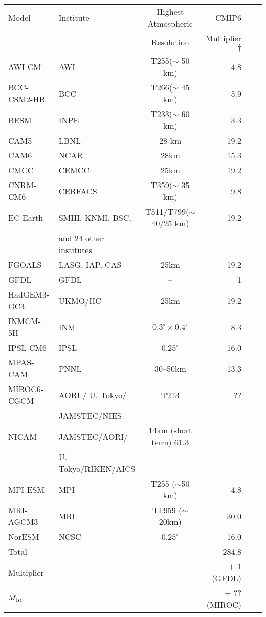 \documentclass[11pt]{article}
\begin{document}
\begin{table}[h]
\centering
\begin{tabular}{|l|l|c|r|r|r|}
\hline
Model & Institute & Highest Atmospheric & CMIP6  \\
& & Resolution & Multiplier$\dagger$ \\
\hline
%
AWI-CM & AWI & T255($\sim$ 50 km)   & 4.8 \\
BCC-CSM2-HR & BCC & T266($\sim$ 45 km)  & 5.9 \\
BESM & INPE & T233($\sim$ 60 km) & 3.3  \\
CAM5 & LBNL & 28 km & 19.2 \\
CAM6 & NCAR & 28km & 15.3 \\
CMCC & CEMCC &  25km & 19.2 \\
CNRM-CM6 & CERFACS & T359($\sim$ 35 km) & 9.8 \\
EC-Earth & SMHI, KNMI, BSC,  & T511/T799($\sim$ 40/25 km) & 19.2 \\
& and 24 other institutes & & \\
FGOALS & LASG, IAP, CAS & 25km & 19.2 \\
GFDL & GFDL & -- & 1 \\
HadGEM3-GC3 & UKMO/HC &  25km & 19.2 \\
 INMCM-5H & INM & $0.3^\circ \times 0.4^\circ$ &  8.3 \\
 IPSL-CM6 & IPSL & $0.25^\circ$ & 16.0 \\
 MPAS-CAM & PNNL &  30--50km & 13.3 \\
 MIROC6-CGCM &AORI / U. Tokyo/ & T213  & ?? \\
 & JAMSTEC/NIES & & \\
 NICAM & JAMSTEC/AORI/  &14km (short term) 61.3 & \\
 & U. Tokyo/RIKEN/AICS  & & \\
 MPI-ESM & MPI &T255 ($\sim$50 km) & 4.8 \\
 MRI-AGCM3 & MRI & TL959 ($\sim$ 20km) & 30.0 \\
 NorESM & NCSC & $0.25^\circ$ & 16.0 \\
 \hline
 Total & & & 284.8 \\
 Multiplier & & & $+$  1 (GFDL) \\
 $M_{\hbox{tot}}$ & & & $+$ ?? (MIROC) \\

\end{tabular}
\end{table}
\end{document}
